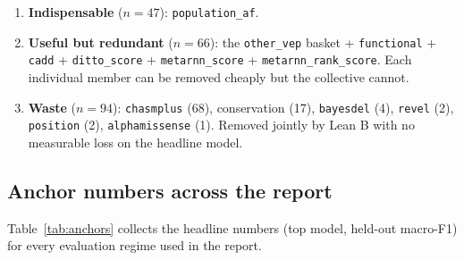 \documentclass[11pt,a4paper]{article}
\begin{document}
\begin{enumerate}[leftmargin=*]
    \item \textbf{Indispensable} ($n=47$): \texttt{population\_af}.
    \item \textbf{Useful but redundant} ($n=66$): the
          \texttt{other\_vep} basket + \texttt{functional} +
          \texttt{cadd} + \texttt{ditto\_score} +
          \texttt{metarnn\_score} + \texttt{metarnn\_rank\_score}.
          Each individual member can be removed cheaply but the
          collective cannot.
    \item \textbf{Waste} ($n=94$): \texttt{chasmplus} (68), conservation
          (17), \texttt{bayesdel} (4), \texttt{revel} (2),
          \texttt{position} (2), \texttt{alphamissense} (1). Removed
          jointly by Lean B with no measurable loss on the headline
          model.
\end{enumerate}

\subsection{Anchor numbers across the report}

Table~\ref{tab:anchors} collects the headline numbers (top model, held-out
macro-F1) for every evaluation regime used in the report.
\end{document}
